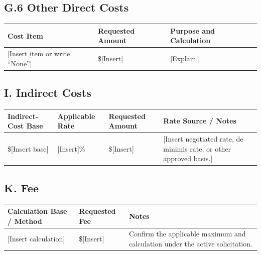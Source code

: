 \documentclass[11pt,letterpaper]{article}
\begin{document}
\subsection*{G.6 Other Direct Costs}

\begin{table}[htbp]
\centering
\renewcommand{\arraystretch}{1.25}
\begin{tabularx}{\textwidth}{
    p{}
    p{}
    X
}
\toprule
\textbf{Cost Item} &
\textbf{Requested Amount} &
\textbf{Purpose and Calculation} \\
\midrule

[Insert item or write ``None''] &
\$[Insert] &
[Explain.] \\

\bottomrule
\end{tabularx}
\end{table}

\subsection*{I. Indirect Costs}

\begin{table}[htbp]
\centering
\renewcommand{\arraystretch}{1.25}
\begin{tabularx}{\textwidth}{
    p{}
    p{}
    p{}
    X
}
\toprule
\textbf{Indirect-Cost Base} &
\textbf{Applicable Rate} &
\textbf{Requested Amount} &
\textbf{Rate Source / Notes} \\
\midrule

\$[Insert base] &
[Insert]\% &
\$[Insert] &
[Insert negotiated rate, de minimis rate, or other approved basis.] \\

\bottomrule
\end{tabularx}
\end{table}

\subsection*{K. Fee}

\begin{table}[htbp]
\centering
\renewcommand{\arraystretch}{1.25}
\begin{tabularx}{\textwidth}{
    p{}
    p{}
    X
}
\toprule
\textbf{Calculation Base / Method} &
\textbf{Requested Fee} &
\textbf{Notes} \\
\midrule

[Insert calculation] &
\$[Insert] &
Confirm the applicable maximum and calculation under the active solicitation. \\

\bottomrule
\end{tabularx}
\end{table}
\end{document}
